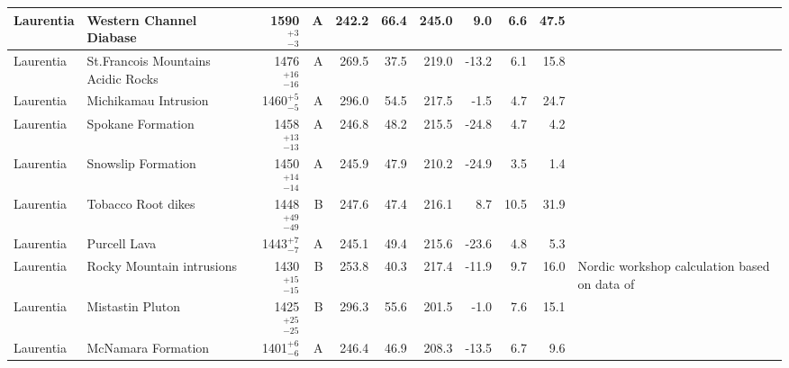 \documentclass[twocolumn, switch]{article} %
\begin{document}
{\begin{landscape}
\begin{ThreePartTable}
\begin{longtable}{p{1.4 in}p{1.2 in}rrrrrrrrp{1.2 in}}
                     Laurentia &                            Western Channel Diabase &     1590$^{+3}_{-3}$ &      A &     242.2 &      66.4 & 245.0 &   9.0 &       6.6 &        47.5 &                                 \cite{Irving1972a} \\ \hline
                     Laurentia &                 St.Francois Mountains Acidic Rocks &   1476$^{+16}_{-16}$ &      A &     269.5 &      37.5 & 219.0 & -13.2 &       6.1 &        15.8 &                                  \cite{Meert2002b} \\ \hline
                     Laurentia &                               Michikamau Intrusion &     1460$^{+5}_{-5}$ &      A &     296.0 &      54.5 & 217.5 &  -1.5 &       4.7 &        24.7 &                                 \cite{Emslie1976a} \\ \hline
                     Laurentia &                                  Spokane Formation &   1458$^{+13}_{-13}$ &      A &     246.8 &      48.2 & 215.5 & -24.8 &       4.7 &         4.2 &                                 \cite{Elston2002a} \\ \hline
                     Laurentia &                                 Snowslip Formation &   1450$^{+14}_{-14}$ &      A &     245.9 &      47.9 & 210.2 & -24.9 &       3.5 &         1.4 &                                 \cite{Elston2002a} \\ \hline
                     Laurentia &                                 Tobacco Root dikes &   1448$^{+49}_{-49}$ &      B &     247.6 &      47.4 & 216.1 &   8.7 &      10.5 &        31.9 &                                 \cite{Harlan2008a} \\ \hline
                     Laurentia &                                       Purcell Lava &     1443$^{+7}_{-7}$ &      A &     245.1 &      49.4 & 215.6 & -23.6 &       4.8 &         5.3 &                                 \cite{Elston2002a} \\ \hline
                     Laurentia &                          Rocky Mountain intrusions &   1430$^{+15}_{-15}$ &      B &     253.8 &      40.3 & 217.4 & -11.9 &       9.7 &        16.0 &  Nordic workshop calculation based on data of \cite{Harlan1994a,Harlan1998a} \\ \hline
                     Laurentia &                                   Mistastin Pluton &   1425$^{+25}_{-25}$ &      B &     296.3 &      55.6 & 201.5 &  -1.0 &       7.6 &        15.1 &                                 \cite{Fahrig1976a} \\ \hline
                     Laurentia &                                 McNamara Formation &     1401$^{+6}_{-6}$ &      A &     246.4 &      46.9 & 208.3 & -13.5 &       6.7 &         9.6 &                                 \cite{Elston2002a} \\ \hline

\end{longtable}
\end{ThreePartTable}
\end{landscape}}
\end{document}
